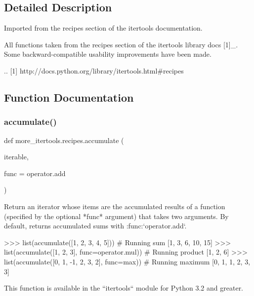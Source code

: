 \subsection{Detailed Description}
\begin{DoxyVerb}Imported from the recipes section of the itertools documentation.

All functions taken from the recipes section of the itertools library docs
[1]_.
Some backward-compatible usability improvements have been made.

.. [1] http://docs.python.org/library/itertools.html#recipes\end{DoxyVerb}
 

\subsection{Function Documentation}
\mbox{\label{namespacemore__itertools_1_1recipes_a652beac76dcf8f1184efc52a82baf6a5}} 
\subsubsection{\texorpdfstring{accumulate()}{accumulate()}}
{\footnotesize\ttfamily def more\+\_\+itertools.\+recipes.\+accumulate (\begin{DoxyParamCaption}\item[{}]{iterable,  }\item[{}]{func = {\ttfamily operator.add} }\end{DoxyParamCaption})}

\begin{DoxyVerb}Return an iterator whose items are the accumulated results of a function
(specified by the optional *func* argument) that takes two arguments.
By default, returns accumulated sums with :func:`operator.add`.

    >>> list(accumulate([1, 2, 3, 4, 5]))  # Running sum
    [1, 3, 6, 10, 15]
    >>> list(accumulate([1, 2, 3], func=operator.mul))  # Running product
    [1, 2, 6]
    >>> list(accumulate([0, 1, -1, 2, 3, 2], func=max))  # Running maximum
    [0, 1, 1, 2, 3, 3]

This function is available in the ``itertools`` module for Python 3.2 and
greater.\end{DoxyVerb}
 \mbox{\label{namespacemore__itertools_1_1recipes_a6400a87494f1598bf44f25baba0aff89}} 
